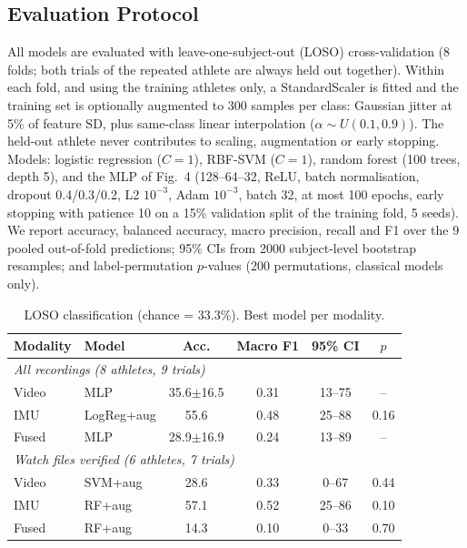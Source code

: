 \subsection{Evaluation Protocol}
All models are evaluated with leave-one-subject-out (LOSO) cross-validation (8
folds; both trials of the repeated athlete are always held out together).
Within each fold, and using the training athletes only, a StandardScaler is
fitted and the training set is optionally augmented to 300 samples per class:
Gaussian jitter at 5\% of feature SD, plus same-class linear interpolation
($\alpha\sim U(0.1,0.9)$). The held-out athlete never contributes to scaling,
augmentation or early stopping. Models: logistic regression ($C=1$), RBF-SVM
($C=1$), random forest (100 trees, depth 5), and the MLP of Fig.~4
(128--64--32, ReLU, batch normalisation, dropout 0.4/0.3/0.2, L2 $10^{-3}$,
Adam $10^{-3}$, batch 32, at most 100 epochs, early stopping with patience 10
on a 15\% validation split of the training fold, 5 seeds). We report accuracy,
balanced accuracy, macro precision, recall and F1 over the 9 pooled
out-of-fold predictions; 95\% CIs from 2000 subject-level bootstrap resamples;
and label-permutation $p$-values (200 permutations, classical models only).

\begin{table}[t]
\caption{LOSO classification (chance = 33.3\%). Best model per modality.}
\label{tab:results}
\centering
\begin{tabular}{llcccc}
\hline
Modality & Model & Acc. & Macro F1 & 95\% CI & $p$ \\
\hline
\multicolumn{6}{l}{\emph{All recordings (8 athletes, 9 trials)}}\\
Video & MLP & 35.6$\pm$16.5 & 0.31 & 13--75 & -- \\
IMU   & LogReg+aug & 55.6 & 0.48 & 25--88 & 0.16 \\
Fused & MLP & 28.9$\pm$16.9 & 0.24 & 13--89 & -- \\
\multicolumn{6}{l}{\emph{Watch files verified (6 athletes, 7 trials)}}\\
Video & SVM+aug & 28.6 & 0.33 & 0--67 & 0.44 \\
IMU   & RF+aug & 57.1 & 0.52 & 25--86 & 0.10 \\
Fused & RF+aug & 14.3 & 0.10 & 0--33 & 0.70 \\
\hline
\end{tabular}
\end{table}

